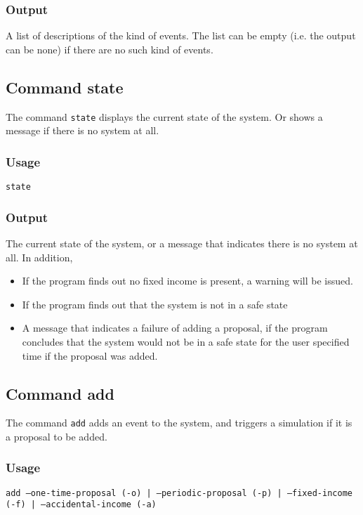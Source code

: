 \subsubsection{Output}
A list of descriptions of the kind of events. The list can be empty (i.e. the output can be none) if there are no such kind of events.

\subsection{Command state}
The command \texttt{state} displays the current state of the system. Or shows a message if there is no system at all.

\subsubsection{Usage}
\begin{center}
	\texttt{state}
\end{center}

\subsubsection{Output}
The current state of the system, or a message that indicates there is no system at all. In addition,
\begin{itemize}
	\item If the program finds out no fixed income is present, a warning will be issued.
	\item If the program finds out that the system is not in a safe state 
	\item A message that indicates a failure of adding a proposal, if the program concludes that the system would not be in a safe state for the user specified time if the proposal was added.
\end{itemize}

\subsection{Command add}
The command \texttt{add} adds an event to the system, and triggers a simulation if it is a proposal to be added.
\subsubsection{Usage}
\begin{center}
	\texttt{add --one-time-proposal (-o) | --periodic-proposal (-p) | --fixed-income (-f) | --accidental-income (-a)}     
\end{center}

